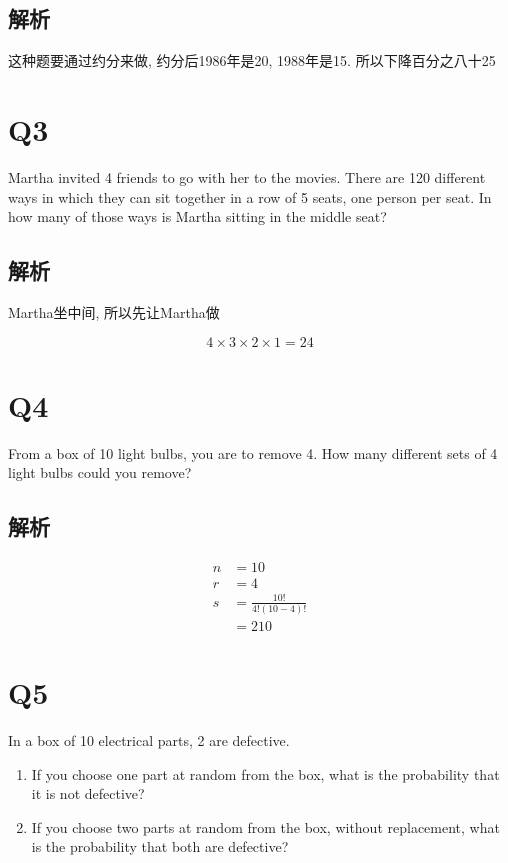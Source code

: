   \subsection{解析}

    这种题要通过约分来做, 约分后1986年是20, 1988年是15. 所以下降百分之八十25

\section{Q3}

  Martha invited 4 friends to go with her to the movies. There are 120
  different ways in which they can sit together in a row of 5 seats,
  one person per seat. In how many of those ways is Martha sitting in the
  middle seat?

  \subsection{解析}

    Martha坐中间, 所以先让Martha做

    \begin{equation*}
      4 \times 3 \times 2 \times 1 = 24
    \end{equation*}

\section{Q4}

  From a box of 10 light bulbs, you are to remove 4. How many different sets
  of 4 light bulbs could you remove?

  \subsection{解析}

    \begin{align*}
      n &= 10 \\
      r &= 4 \\
      s &= \frac{10!}{4!\left( 10 - 4 \right)!} \\
      &= 210
    \end{align*}

\section{Q5}

  In a box of 10 electrical parts, 2 are defective.

  \begin{enumerate}
    \item If you choose one part at random from the box, what is the
    probability that it is not defective?
    \item If you choose two parts at random from the box, without replacement,
    what is the probability that both are defective?
  \end{enumerate}

